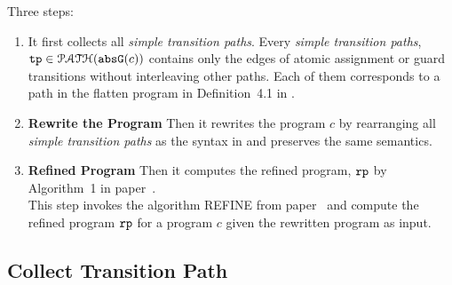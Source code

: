 Three steps:
\begin{enumerate}
  \item It first collects all \emph{simple transition paths}.
  Every \emph{simple transition paths}, $\mathtt{tp} \in \mathcal{PATH}(\mathtt{abs}{\mathtt{G}}(c))$ 
  contains only the edges of atomic assignment or guard transitions without interleaving other paths.
  Each of them corresponds to a path in the flatten program in Definition~4.1 in \cite{GulwaniJK09}.
%
    \item \textbf{Rewrite the Program}
    Then it rewrites the program $c$ by rearranging all \emph{simple transition paths} as the syntax in \cite{GulwaniJK09} and preserves the same semantics.
\item \textbf{Refined Program}
Then it computes the 
refined program, $\mathtt{rp}$ by Algorithm~1 in paper~\cite{GulwaniJK09}.
\\
This step invokes the algorithm REFINE from paper~\cite{GulwaniJK09} and compute the 
refined program $\mathtt{rp}$ for a program $c$ given the rewritten program as input.
\end{enumerate}

\subsection{Collect Transition Path}

